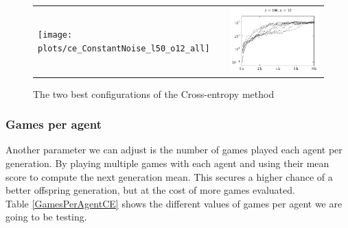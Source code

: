 \begin{figure}[H]
\begin{tabular}{@{}l@{}l@{}}
\texttt{[image: plots/ce\_ConstantNoise\_l50\_o12\_all]} &
\includegraphics[scale=1]{plots/ce_ConstantNoise_l100_o10_all}
\end{tabular}
\caption{The two best configurations of the Cross-entropy method 
\label{fig:bestConfCE}}
\end{figure}

\subsubsection{Games per agent \label{GamesPerAgentCESection}}
Another parameter we can adjust is the number of 
games played each agent per generation. By playing
multiple games with each agent and using their 
mean score to compute the next generation mean. This
secures a higher chance of a better offspring generation,
but at the cost of more games
evaluated.\\
Table \ref{GamesPerAgentCE} shows the different values of
games per agent we are going to be
testing.

